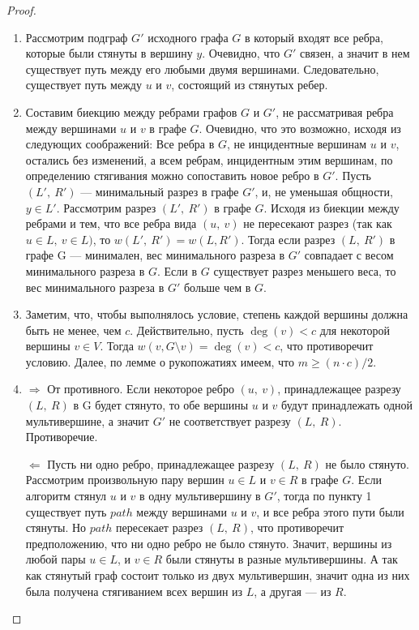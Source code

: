 \documentclass[a4paper,12pt]{article}
\begin{document}
\begin{proof}
\begin{enumerate}
    \item Рассмотрим подграф $G'$ исходного графа $G$ в который входят все ребра, которые были стянуты в вершину $y$. Очевидно, что $G'$ связен, а значит в нем существует путь между его любыми двумя вершинами. Следовательно, существует путь между $u$ и $v$, состоящий из стянутых ребер.
    \item Составим биекцию между ребрами графов $G$ и $G'$, не рассматривая ребра между вершинами $u$ и $v$ в графе $G$. Очевидно, что это возможно, исходя из следующих соображений: Все ребра в $G$, не инцидентные вершинам $u$ и $v$, остались без изменений, а всем ребрам, инцидентным этим вершинам, по определению стягивания можно сопоставить новое ребро в $G'$. Пусть $(L',\ R')$ — минимальный разрез в графе $G'$, и, не уменьшая общности, $y \in L'$. Рассмотрим разрез $(L',\ R')$ в графе  $G$. Исходя из биекции между ребрами и тем, что все ребра вида $(u,\ v)$ не пересекают разрез (так как $u \in L,\ v \in L)$, то $w(L',\ R') = w(L, R')$. Тогда если разрез $(L,\ R')$ в графе  G — минимален, вес минимального разреза в $G'$ совпадает с весом минимального разреза в $G$. Если в $G$ существует разрез меньшего веса, то вес минимального разреза в $G'$ больше чем в $G$.
    \item Заметим, что, чтобы выполнялось условие, степень каждой вершины должна быть не менее, чем $c$. Действительно, пусть $\deg(v) < c$ для некоторой вершины $v \in V$. Тогда $w(v, G \setminus v) = \deg(v) < c$, что противоречит условию. Далее, по лемме о рукопожатиях имеем, что $m \geqslant (n \cdot c)/2$.
    \item $\Longrightarrow$ От противного. Если некоторое ребро $(u,\ v)$, принадлежащее разрезу $(L,\ R)$ в G будет стянуто, то обе вершины $u$ и $v$ будут принадлежать одной мультивершине, а значит $G'$ не соответствует разрезу $(L,\ R)$. Противоречие.

    $\Longleftarrow$ Пусть ни одно ребро, принадлежащее разрезу $(L,\ R)$ не было стянуто. Рассмотрим произвольную пару вершин $u \in L$ и $v \in R$ в графе $G$. Если алгоритм стянул $u$ и $v$ в одну мультивершину в $G'$, тогда по пункту 1 существует путь $path$ между вершинами $u$ и $v$, и все ребра этого пути были стянуты. Но $path$ пересекает разрез $(L,\ R)$, что противоречит предположению, что ни одно ребро не было стянуто. Значит, вершины из любой пары $u \in L$, и $v \in R$ были стянуты в разные мультивершины. А так как стянутый граф состоит только из двух мультивершин, значит одна из них была получена стягиванием всех вершин из $L$, а другая — из $R$.
\end{enumerate}
\end{proof}
\end{document}
